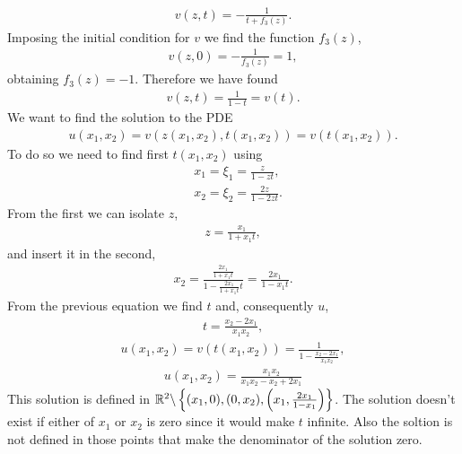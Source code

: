 \begin{questions}
\begin{solution}
\begin{align*}
v(z,t)=-\frac{1}{t+f_3(z)}.
\end{align*}
Imposing the initial condition for $v$ we find the function $f_3(z)$,
\begin{align*}
v(z,0)=-\frac{1}{f_3(z)}=1,
\end{align*}
obtaining $f_3(z)=-1$. Therefore we have found
\begin{align*}
v(z,t)=\frac{1}{1-t}=v(t).
\end{align*}
We want to find the solution to the PDE
\begin{align*}
u(x_1,x_2)=v(z(x_1,x_2),t(x_1,x_2))
=v(t(x_1,x_2)).
\end{align*}
To do so we need to find first $t(x_1,x_2)$ using
\begin{align*}
&x_1=\xi_1=\frac{z}{1-zt},\\
&x_2=\xi_2=\frac{2z}{1-2zt}.
\end{align*}
From the first we can isolate $z$,
\begin{align*}
z=\frac{x_1}{1+x_1t},
\end{align*}
and insert it in the second,
\begin{align*}
x_2=\frac{\frac{2x_1}{1+x_1t}}{1-\frac{2x_1}{1+x_1t}t}=\frac{2x_1}{1-x_1t}.
\end{align*}
From the previous equation we find $t$ and, consequently $u$,
\begin{align*}
t=\frac{x_2-2x_1}{x_1x_2},
\end{align*}
\begin{align*}
u(x_1,x_2)=v(t(x_1,x_2))=\frac{1}{1-\frac{x_2-2x_1}{x_1x_2}},
\end{align*}
\begin{align*}
u(x_1,x_2)=\frac{x_1x_2}{x_1x_2-x_2+2x_1}
\end{align*}
This solution is defined in $\mathbb{R}^2\backslash\left\lbrace(x_1,0),(0,x_2),\left(x_1,\frac{2x_1}{1-x_1}\right)\right\rbrace$. The solution doesn't exist if either of $x_1$ or $x_2$ is zero since it would make $t$ infinite. Also the soltion is not defined in those points that make the denominator of the solution zero.
\end{solution}

\end{questions}